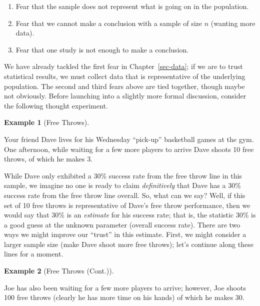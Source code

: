 \documentclass[
  letterpaper,
  DIV=11,
  numbers=noendperiod]{scrreprt}
\providecommand{\tightlist}{%
  \setlength{\itemsep}{0pt}\setlength{\parskip}{0pt}}\usepackage{longtable,booktabs,array}
\theoremstyle{plain}
\theoremstyle{definition}
\newtheorem{example}{Example}[chapter]
\theoremstyle{definition}
\theoremstyle{remark}
\begin{document}
\begin{enumerate}
\def\labelenumi{\arabic{enumi}.}
\tightlist
\item
  Fear that the sample does not represent what is going on in the
  population.
\item
  Fear that we cannot make a conclusion with a sample of size \(n\)
  (wanting more data).
\item
  Fear that one study is not enough to make a conclusion.
\end{enumerate}

We have already tackled the first fear in Chapter~\ref{sec-data}; if we
are to trust statistical results, we must collect data that is
representative of the underlying population. The second and third fears
above are tied together, though maybe not obviously. Before launching
into a slightly more formal discussion, consider the following thought
experiment.

\begin{example}[Free
Throws]\protect\hypertarget{exm-samplingdistns-free-throws}{}\label{exm-samplingdistns-free-throws}

Your friend Dave lives for his Wednesday ``pick-up'' basketball games at
the gym. One afternoon, while waiting for a few more players to arrive
Dave shoots 10 free throws, of which he makes 3.

\end{example}

While Dave only exhibited a 30\% success rate from the free throw line
in this sample, we imagine no one is ready to claim \emph{definitively}
that Dave has a 30\% success rate from the free throw line overall. So,
what can we say? Well, if this set of 10 free throws is representative
of Dave's free throw performance, then we would say that 30\% is an
\emph{estimate} for his success rate; that is, the statistic 30\% is a
good guess at the unknown parameter (overall success rate). There are
two ways we might improve our ``trust'' in this estimate. First, we
might consider a larger sample size (make Dave shoot more free throws);
let's continue along these lines for a moment.

\begin{example}[Free Throws
(Cont.)]\protect\hypertarget{exm-samplingdistns-free-throws2}{}\label{exm-samplingdistns-free-throws2}

Joe has also been waiting for a few more players to arrive; however, Joe
shoots 100 free throws (clearly he has more time on his hands) of which
he makes 30.

\end{example}
\end{document}

